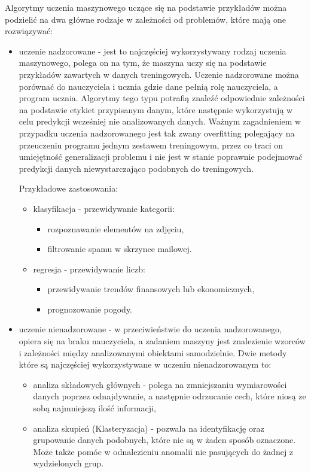 Algorytmy uczenia maszynowego uczące się na podstawie przykładów można podzielić na dwa główne rodzaje w zależności od problemów, które mają one rozwiązywać:
\begin{itemize}
    \item uczenie nadzorowane -
    jest to najczęściej wykorzystywany rodzaj uczenia maszynowego, polega on na tym,
    że maszyna uczy się na podstawie przykładów zawartych w danych treningowych.
    Uczenie nadzorowane można porównać do nauczyciela i ucznia gdzie dane pełnią rolę nauczyciela, 
    a program ucznia. Algorytmy tego typu potrafią znaleźć odpowiednie zależności na podstawie
    etykiet przypisanym danym,
    które następnie wykorzystują w celu predykcji wcześniej nie analizowanych danych.
    Ważnym zagadnieniem w przypadku uczenia nadzorowanego jest tak zwany overfitting polegający 
    na przeuczeniu programu jednym zestawem treningowym, przez co traci on umiejętność generalizacji problemu
    i nie jest w stanie poprawnie podejmować predykcji danych niewystarczająco podobnych
    do treningowych.

    Przykładowe zastosowania:
    \begin{itemize}
        \item klasyfikacja - przewidywanie kategorii:
        \begin{itemize}
            \item rozpoznawanie elementów na zdjęciu,
            \item filtrowanie spamu w skrzynce mailowej.
        \end{itemize}
        \item regresja - przewidywanie liczb:
        \begin{itemize}
            \item przewidywanie trendów finansowych lub ekonomicznych,
            \item prognozowanie pogody.
        \end{itemize}
    \end{itemize}
    \item uczenie nienadzorowane -
    w przeciwieństwie do uczenia nadzorowanego, opiera się na braku
    nauczyciela, a zadaniem maszyny jest znalezienie wzorców i zależności między analizowanymi
    obiektami samodzielnie. Dwie metody które są najczęściej wykorzystywane w uczeniu nienadzorowanym
    to:
    \begin{itemize}
        \item analiza składowych głównych - polega na zmniejszaniu wymiarowości danych poprzez
        odnajdywanie, a następnie odrzucanie cech, które niosą ze sobą najmniejszą ilość informacji,
        \item analiza skupień (Klasteryzacja) - pozwala na identyfikację oraz grupowanie danych
        podobnych, które nie są w żaden sposób oznaczone. Może także pomóc w odnalezieniu anomalii
        nie pasujących do żadnej z wydzielonych grup.
        

\end{itemize}
\end{itemize}
